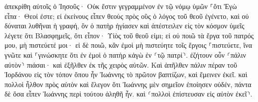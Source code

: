 \documentclass{openreader}
\begin{document}
ἀπεκρίθη αὐτοῖς ὁ Ἰησοῦς· Οὐκ ἔστιν γεγραμμένον ἐν τῷ νόμῳ ὑμῶν ⸀ὅτι Ἐγὼ εἶπα· Θεοί ἐστε; 
εἰ ἐκείνους εἶπεν θεοὺς πρὸς οὓς ὁ λόγος τοῦ θεοῦ ἐγένετο, καὶ οὐ δύναται λυθῆναι ἡ γραφή, 
ὃν ὁ πατὴρ ἡγίασεν καὶ ἀπέστειλεν εἰς τὸν κόσμον ὑμεῖς λέγετε ὅτι Βλασφημεῖς, ὅτι εἶπον· Υἱὸς τοῦ θεοῦ εἰμι; 
εἰ οὐ ποιῶ τὰ ἔργα τοῦ πατρός μου, μὴ πιστεύετέ μοι· 
εἰ δὲ ποιῶ, κἂν ἐμοὶ μὴ πιστεύητε τοῖς ἔργοις ⸀πιστεύετε, ἵνα γνῶτε καὶ ⸀γινώσκητε ὅτι ἐν ἐμοὶ ὁ πατὴρ κἀγὼ ἐν ⸂τῷ πατρί⸃. 
ἐζήτουν οὖν ⸂πάλιν αὐτὸν⸃ πιάσαι· καὶ ἐξῆλθεν ἐκ τῆς χειρὸς αὐτῶν. 
Καὶ ἀπῆλθεν πάλιν πέραν τοῦ Ἰορδάνου εἰς τὸν τόπον ὅπου ἦν Ἰωάννης τὸ πρῶτον βαπτίζων, καὶ ἔμεινεν ἐκεῖ. 
καὶ πολλοὶ ἦλθον πρὸς αὐτὸν καὶ ἔλεγον ὅτι Ἰωάννης μὲν σημεῖον ἐποίησεν οὐδέν, πάντα δὲ ὅσα εἶπεν Ἰωάννης περὶ τούτου ἀληθῆ ἦν. 
καὶ ⸂πολλοὶ ἐπίστευσαν εἰς αὐτὸν ἐκεῖ⸃. 
\end{document}
